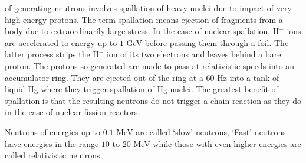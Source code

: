 \documentclass{article}
\numberwithin{equation}{section}
\begin{document}
of generating neutrons involves spallation of heavy nuclei due to impact of 
very high energy protons. The term spallation means ejection of fragments from
a body due to extraordinarily large stress. In the case of nuclear spallation,
$\text{H}^{-}$ ions are accelerated to energy up to $1$ GeV before passing
them through a foil. The latter process strips the $\text{H}^{-}$ ion of its
two electrons and leaves behind a bare proton. The protons so generated are
made to pass at relativistic speeds into an accumulator ring. They are 
ejected out of the ring at a $60$ Hz into a tank of liquid Hg where they
trigger spallation of Hg nuclei. The greatest benefit of spallation is that
the resulting neutrons do not trigger a chain reaction as they do in the case
of nuclear fission reactors.

Neutrons of energies up to $0.1$ MeV are called `slow' neutrons, `Fast'
neutrons have energies in the range $10$ to $20$ MeV while those with even
higher energies are called relativistic neutrons.
\end{document}
